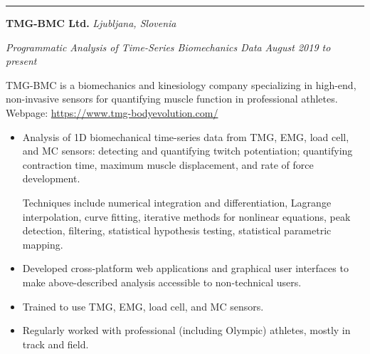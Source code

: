 \documentclass[10pt, a4paper]{article}
\newcommand{\rangesep}{to\xspace}  %
\renewcommand{\date}[1]{\textit{#1}}
\newcommand{\location}[1]{\textit{#1}}
\newcommand{\heading}[1]{
    \makebox[0pt][l]{\Large \sc \hspace{2pt}#1}
    \rule[-0.7ex]{\columnwidth}{0.5pt}\vspace{1.0ex}
    }
\newcommand{\subheading}[1]{{\bfseries #1}}
\newenvironment{mysection}[1]
    {\vspace{3.5ex}
    \heading{#1}
    \begin{adjustwidth}{0.3cm}{0cm}}
    {\end{adjustwidth} }
\begin{document}
    \begin{mysection}{Employment}
        \subheading{TMG-BMC Ltd.} \hfill \location{Ljubljana, Slovenia}

        \textit{Programmatic Analysis of Time-Series Biomechanics Data} \hfill \date{August 2019 \rangesep present}

        \vspace{1ex}
        TMG-BMC is a biomechanics and kinesiology company specializing in high-end, non-invasive sensors for quantifying muscle function in professional athletes. Webpage: \url{https://www.tmg-bodyevolution.com/}

        \begin{itemize}

            \item Analysis of 1D biomechanical time-series data from TMG, EMG, load cell, and MC sensors: detecting and quantifying twitch potentiation; quantifying contraction time, maximum muscle displacement, and rate of force development.

            Techniques include numerical integration and differentiation, Lagrange interpolation, curve fitting, iterative methods for nonlinear equations, peak detection, filtering, statistical hypothesis testing, statistical parametric mapping.

            \item Developed cross-platform web applications and graphical user interfaces to make above-described analysis accessible to non-technical users.

            \item Trained to use TMG, EMG, load cell, and MC sensors.

            \item Regularly worked with professional (including Olympic) athletes, mostly in track and field.

        \end{itemize}

    \end{mysection}

    \newpage
\end{document}

